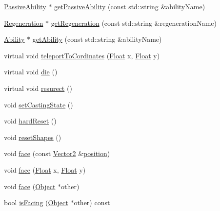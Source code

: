 \begin{DoxyCompactItemize}
\item 
\hyperlink{classZeta_1_1PassiveAbility}{Passive\+Ability} $\ast$ \hyperlink{classZeta_1_1Lifeform_ac176b1bdbe102fc035ff0b07778aa909}{get\+Passive\+Ability} (const std\+::string \&ability\+Name)
\item 
\hyperlink{classZeta_1_1Regeneration}{Regeneration} $\ast$ \hyperlink{classZeta_1_1Lifeform_a4335babc59b44197e65b93de6049a31e}{get\+Regeneration} (const std\+::string \&regeneration\+Name)
\item 
\hyperlink{classZeta_1_1Ability}{Ability} $\ast$ \hyperlink{classZeta_1_1Lifeform_a1447e287b1c7f9dbd5a999f8c4132cac}{get\+Ability} (const std\+::string \&ability\+Name)
\item 
virtual void \hyperlink{classZeta_1_1Lifeform_ac04c640f993208699ba02f996fd39107}{teleport\+To\+Cordinates} (\hyperlink{namespaceZeta_a1e0a1265f9b3bd3075fb0fabd39088ba}{Float} x, \hyperlink{namespaceZeta_a1e0a1265f9b3bd3075fb0fabd39088ba}{Float} y)
\item 
virtual void \hyperlink{classZeta_1_1Lifeform_adb880c031ef285dc10b0f48d8f5381b7}{die} ()
\item 
virtual void \hyperlink{classZeta_1_1Lifeform_a75de0c9b2babb8a2cb3987620d2c0b56}{resurect} ()
\item 
void \hyperlink{classZeta_1_1Lifeform_ae3d97ad71c556854a2a2e86b866f5bbb}{set\+Casting\+State} ()
\item 
void \hyperlink{classZeta_1_1Lifeform_a272e506ace6dbe2e1b156d69b66f5a33}{hard\+Reset} ()
\item 
void \hyperlink{classZeta_1_1Lifeform_aa32186819fccd35ac0c4a1bebd5f8ba2}{reset\+Shapes} ()
\item 
void \hyperlink{classZeta_1_1Lifeform_aaed1791a9e8a292c4ba4e26055860bdb}{face} (const \hyperlink{classZeta_1_1Vector2}{Vector2} \&\hyperlink{classZeta_1_1Object_a4035f758ac73cb1f0e4d85778d033956}{position})
\item 
void \hyperlink{classZeta_1_1Lifeform_a5f32aa001fc2ea28da443d7e5780f692}{face} (\hyperlink{namespaceZeta_a1e0a1265f9b3bd3075fb0fabd39088ba}{Float} x, \hyperlink{namespaceZeta_a1e0a1265f9b3bd3075fb0fabd39088ba}{Float} y)
\item 
void \hyperlink{classZeta_1_1Lifeform_a6072092d3346c643511439e9a203e3cd}{face} (\hyperlink{classZeta_1_1Object}{Object} $\ast$other)
\item 
bool \hyperlink{classZeta_1_1Lifeform_a65b18af57b0a49048c181e5da01fbbc9}{is\+Facing} (\hyperlink{classZeta_1_1Object}{Object} $\ast$other) const 
\item 

\end{DoxyCompactItemize}

